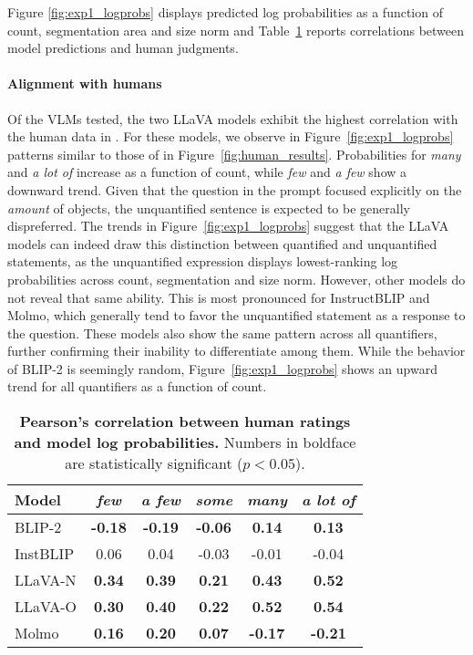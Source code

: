 Figure \ref{fig:exp1_logprobs} displays predicted log probabilities as a function of count, segmentation area and size norm and Table~\ref{tab:exp1_correlations} reports correlations between model predictions and human judgments.


\paragraph{Alignment with humans}
Of the VLMs tested, the two LLaVA models exhibit the highest
correlation with the human data in \dataset. 
For these models, we observe in Figure~\ref{fig:exp1_logprobs} patterns similar to those of \dataset in Figure~\ref{fig:human_results}. 
Probabilities for \textit{many} and \textit{a lot of} increase as a function of count, while \textit{few} and \textit{a few} show a downward trend. Given that the question in the prompt focused explicitly on the {\em amount} of objects, the unquantified sentence is expected to be generally dispreferred. The trends in Figure~\ref{fig:exp1_logprobs} suggest
that the LLaVA models can indeed draw this distinction between quantified and unquantified statements, as the unquantified expression displays lowest-ranking log probabilities across count, segmentation and size norm. 
However, other models do not reveal that same ability. 
This is most pronounced for InstructBLIP and Molmo, which generally tend to favor the unquantified statement as a response to the question. 
These models also show the same pattern across all quantifiers, further confirming their inability to differentiate among them. 
While the behavior of BLIP-2 is seemingly random, Figure~\ref{fig:exp1_logprobs} shows an upward trend for all quantifiers as a function of count.

\begin{table}
    \centering
    \small
    \begin{tabular}{l|ccccc}
    \toprule
    \textbf{Model} & \textbf{\textit{few}} & \textbf{\textit{a few}} & \textbf{\textit{some}} & \textbf{\textit{many}} & \textbf{\textit{a lot of}} \\ \midrule
        BLIP-2          & \textbf{-0.18} & \textbf{-0.19} & \textbf{-0.06} & \textbf{0.14} & \textbf{0.13} \\
        InstBLIP    & 0.06 & 0.04 & -0.03 & -0.01 & -0.04 \\
        LLaVA-N      & \textbf{0.34} & \textbf{0.39} & \textbf{0.21} & \textbf{0.43} & \textbf{0.52} \\ 
        LLaVA-O & \textbf{0.30} & \textbf{0.40} & \textbf{0.22} & \textbf{0.52} & \textbf{0.54} \\
        Molmo           & \textbf{0.16} & \textbf{0.20} & \textbf{0.07} & \textbf{-0.17} & \textbf{-0.21} \\
    \bottomrule
    \end{tabular}
    \caption{\textbf{Pearson's correlation between human ratings and model log probabilities.} Numbers in boldface are statistically significant ($p < 0.05$).}
 \label{tab:exp1_correlations}
 \end{table}
 
